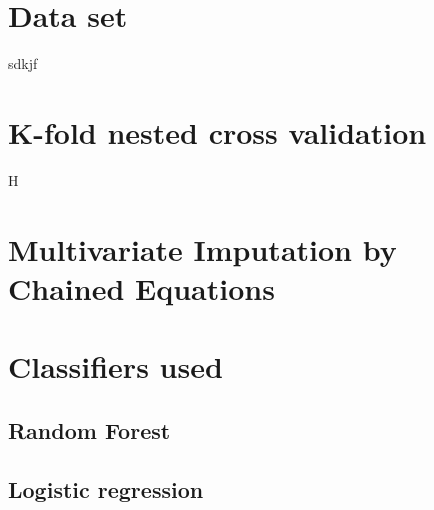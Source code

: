\section{Data set}
sdkjf
\section{K-fold nested cross validation}
H
\section{Multivariate Imputation by Chained Equations}
\section{Classifiers used}
\subsection{Random Forest}
\subsection{Logistic regression}